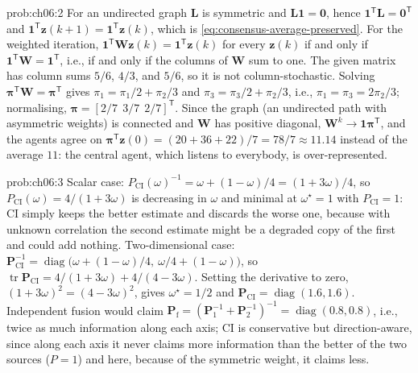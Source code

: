 \documentclass[graybox,envcountchap]{style/SNmono}
\DeclareMathOperator{\diag}{diag}
\DeclareMathOperator{\tr}{tr}
\begin{document}
\begin{sol}{prob:ch06:2}
For an undirected graph $\mathbf{L}$ is symmetric and $\mathbf{L}\mathbf{1}=\mathbf{0}$, hence $\mathbf{1}^{\mathsf T}\mathbf{L}=\mathbf{0}^{\mathsf T}$ and $\mathbf{1}^{\mathsf T}\mathbf{z}(k+1)=\mathbf{1}^{\mathsf T}\mathbf{z}(k)$, which is \eqref{eq:consensus-average-preserved}. For the weighted iteration, $\mathbf{1}^{\mathsf T}\mathbf{W}\mathbf{z}(k)=\mathbf{1}^{\mathsf T}\mathbf{z}(k)$ for every $\mathbf{z}(k)$ if and only if $\mathbf{1}^{\mathsf T}\mathbf{W}=\mathbf{1}^{\mathsf T}$, i.e., if and only if the columns of $\mathbf{W}$ sum to one. The given matrix has column sums $5/6$, $4/3$, and $5/6$, so it is not column-stochastic. Solving $\boldsymbol{\pi}^{\mathsf T}\mathbf{W}=\boldsymbol{\pi}^{\mathsf T}$ gives $\pi_1=\pi_1/2+\pi_2/3$ and $\pi_3=\pi_3/2+\pi_2/3$, i.e., $\pi_1=\pi_3=2\pi_2/3$; normalising, $\boldsymbol{\pi}=[2/7\ \ 3/7\ \ 2/7]^{\mathsf T}$. Since the graph (an undirected path with asymmetric weights) is connected and $\mathbf{W}$ has positive diagonal, $\mathbf{W}^{k}\to\mathbf{1}\boldsymbol{\pi}^{\mathsf T}$, and the agents agree on $\boldsymbol{\pi}^{\mathsf T}\mathbf{z}(0)=(20+36+22)/7=78/7\approx11.14$ instead of the average $11$: the central agent, which listens to everybody, is over-represented.
\end{sol}

\begin{sol}{prob:ch06:3}
Scalar case: $P_{\mathrm{CI}}(\omega)^{-1}=\omega+(1-\omega)/4=(1+3\omega)/4$, so $P_{\mathrm{CI}}(\omega)=4/(1+3\omega)$ is decreasing in $\omega$ and minimal at $\omega^{\star}=1$ with $P_{\mathrm{CI}}=1$: CI simply keeps the better estimate and discards the worse one, because with unknown correlation the second estimate might be a degraded copy of the first and could add nothing. Two-dimensional case: $\mathbf{P}_{\mathrm{CI}}^{-1}=\diag\!\big(\omega+(1-\omega)/4,\ \omega/4+(1-\omega)\big)$, so $\tr\mathbf{P}_{\mathrm{CI}}=4/(1+3\omega)+4/(4-3\omega)$. Setting the derivative to zero, $(1+3\omega)^{2}=(4-3\omega)^{2}$, gives $\omega^{\star}=1/2$ and $\mathbf{P}_{\mathrm{CI}}=\diag(1.6,1.6)$. Independent fusion would claim $\mathbf{P}_{\mathrm{f}}=(\mathbf{P}_1^{-1}+\mathbf{P}_2^{-1})^{-1}=\diag(0.8,0.8)$, i.e., twice as much information along each axis; CI is conservative but direction-aware, since along each axis it never claims more information than the better of the two sources ($P=1$) and here, because of the symmetric weight, it claims less.
\end{sol}
\end{document}

